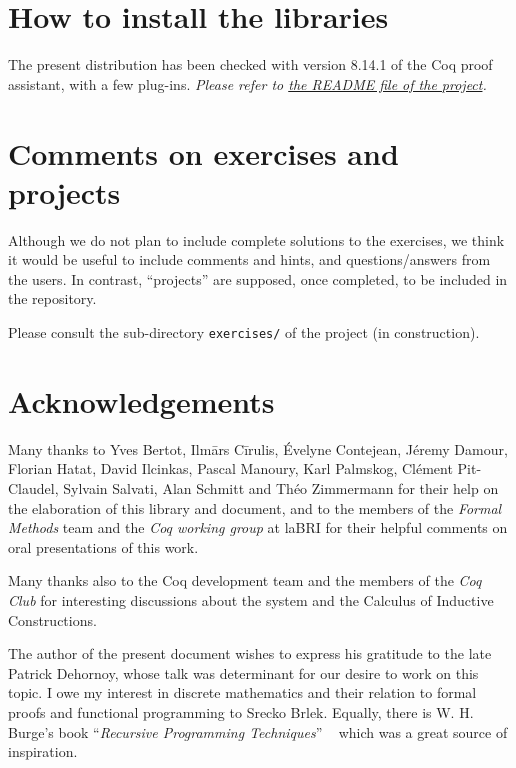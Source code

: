 \documentclass[twoside,a4paper]{book}
\newcounter{snippets}
\begin{document}




\section{How to install the libraries}
\label{sec:orgheadline4}
 The present distribution has been checked with version 8.14.1 of the Coq proof assistant, with a few plug-ins. \emph{Please refer to \href{https://github.com/coq-community/hydra-battle\#readme}{the README file of the project}.}


\section{Comments on exercises and projects}

Although we do not plan to include complete solutions to the exercises, 
we think it would be useful to include comments and hints, and questions/answers from the users. In contrast, ``projects'' are supposed, once completed, to be included in the repository.

Please consult the sub-directory \texttt{exercises/} of the
 project (in construction).

\section{Acknowledgements}
\label{sec:orgheadline5}
    Many thanks to Yves Bertot, Ilm\={a}rs C\={i}rulis, \'Evelyne Contejean, Jéremy Damour,   Florian Hatat,  David Ilcinkas, 
Pascal Manoury,  Karl Palmskog, Cl\'ement Pit-Claudel, Sylvain Salvati, Alan Schmitt and Théo Zimmermann for their help on the elaboration of this library and  document, and to the
 members of the \emph{Formal Methods} team and the \emph{Coq working group} at laBRI for their helpful comments 
on  oral presentations of this work. 

Many thanks also to the Coq development team and the members of the \emph{Coq Club} for interesting discussions about the \coq{} system and the Calculus of Inductive Constructions.

The author of the present document wishes to express his gratitude to the late Patrick Dehornoy, whose talk  was determinant for our desire to work on this topic.
I owe my interest in discrete mathematics and their relation to formal proofs and functional programming  to Srecko Brlek.  Equally, there is W. H. Burge's book ``\emph{Recursive Programming Techniques}'' ~\cite{burge} which was a great  source of inspiration.
\end{document}
